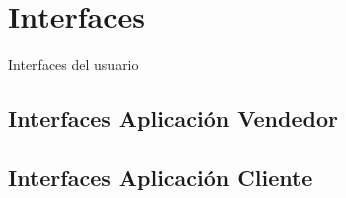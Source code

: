 \section{Interfaces}

Interfaces del usuario

\subsection{Interfaces Aplicación Vendedor}

\subsection{Interfaces Aplicación Cliente}